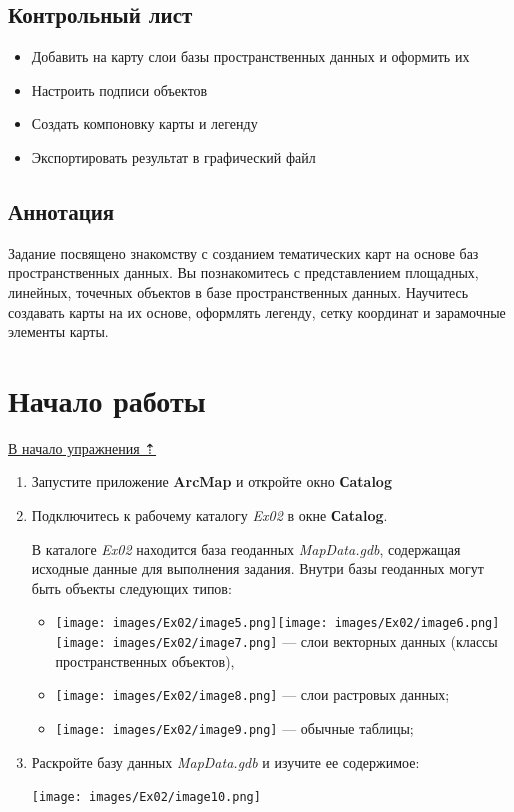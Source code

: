 \documentclass[12pt,]{book}
\providecommand{\tightlist}{%
  \setlength{\itemsep}{0pt}\setlength{\parskip}{0pt}}
\begin{document}
\hypertarget{map-design-general-control}{%
\subsection{Контрольный лист}\label{map-design-general-control}}

\begin{itemize}
\tightlist
\item
  Добавить на карту слои базы пространственных данных и оформить их
\item
  Настроить подписи объектов
\item
  Создать компоновку карты и легенду
\item
  Экспортировать результат в графический файл
\end{itemize}

\hypertarget{map-design-general-annotation}{%
\subsection{Аннотация}\label{map-design-general-annotation}}

Задание посвящено знакомству с созданием тематических карт на основе баз пространственных данных. Вы познакомитесь с представлением площадных, линейных, точечных объектов в базе пространственных данных. Научитесь создавать карты на их основе, оформлять легенду, сетку координат и зарамочные элементы карты.

\hypertarget{map-design-general-begin}{%
\section{Начало работы}\label{map-design-general-begin}}

\protect\hyperlink{map-design-general}{В начало упражнения ⇡}

\begin{enumerate}
\def\labelenumi{\arabic{enumi}.}
\item
  Запустите приложение \textbf{ArcMap} и откройте окно \textbf{Сatalog}
\item
  Подключитесь к рабочему каталогу \emph{Ex02} в окне \textbf{Сatalog}.

  В каталоге \emph{Ex02} находится база геоданных \emph{MapData.gdb}, содержащая исходные данные для выполнения задания. Внутри базы геоданных могут быть объекты следующих типов:

  \begin{itemize}
  \tightlist
  \item
    \texttt{[image: images/Ex02/image5.png]}\texttt{[image: images/Ex02/image6.png]}\texttt{[image: images/Ex02/image7.png]} --- слои векторных данных (классы пространственных объектов),
  \item
    \texttt{[image: images/Ex02/image8.png]} --- слои растровых данных;
  \item
    \texttt{[image: images/Ex02/image9.png]} --- обычные таблицы;
  \end{itemize}
\item
  Раскройте базу данных \emph{MapData.gdb} и изучите ее содержимое:

  \texttt{[image: images/Ex02/image10.png]}
\end{enumerate}
\end{document}
